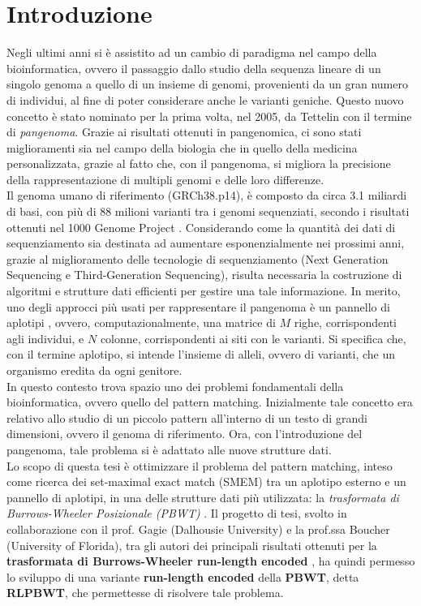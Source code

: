 \documentclass[a4paper,12pt, oneside, draft]{book}
\begin{document}
\chapter{Introduzione}
Negli ultimi anni si è assistito ad un cambio di paradigma nel campo della
bioinformatica, ovvero il passaggio dallo studio della sequenza lineare di un
singolo genoma a quello di un insieme di genomi, provenienti da un gran numero
di individui, al fine di poter considerare anche le varianti
geniche. Questo nuovo concetto è stato nominato per la prima volta, nel 2005,
da Tettelin \cite{tettelin} con il termine di \textit{pangenoma}. Grazie ai
risultati ottenuti in pangenomica, ci sono stati miglioramenti sia nel 
campo della biologia che in quello della medicina personalizzata, grazie al
fatto che, con il pangenoma, si migliora la precisione della rappresentazione di
multipli genomi e delle loro differenze. \\
Il genoma umano di riferimento (GRCh38.p14), è composto da circa
3.1 miliardi di basi, con più di 88 milioni 
varianti tra i genomi sequenziati, secondo i risultati ottenuti nel 1000 Genome
Project \cite{tutorial}. Considerando come la quantità dei dati di
sequenziamento sia destinata 
ad aumentare esponenzialmente nei prossimi anni, grazie al
miglioramento delle tecnologie di sequenziamento (Next Generation Sequencing e
Third-Generation Sequencing), risulta necessaria la costruzione di algoritmi e
strutture dati efficienti per gestire una tale informazione. 
In merito, uno degli approcci più usati per rappresentare il pangenoma è un
pannello di aplotipi \cite{pancon}, ovvero, computazionalmente, una matrice di
$M$ righe, corrispondenti agli individui, e $N$ colonne, corrispondenti ai siti
con le varianti. Si specifica che, con il termine
aplotipo, si intende l'insieme di alleli, ovvero di varianti, che un organismo
eredita da ogni genitore.\\
In questo contesto trova spazio uno dei problemi fondamentali della
bioinformatica, ovvero quello del pattern matching. Inizialmente tale concetto
era relativo allo studio di un piccolo pattern all'interno di un testo di
grandi dimensioni, ovvero il genoma di riferimento. Ora, con l'introduzione 
del pangenoma, tale problema si è adattato alle nuove strutture
dati.\\
Lo scopo di questa tesi è ottimizzare il problema del pattern 
matching, inteso come ricerca dei set-maximal exact match (SMEM) tra un aplotipo
esterno e un pannello di aplotipi, in una delle 
strutture dati più utilizzata: la \textit{trasformata di Burrows-Wheeler
  Posizionale (PBWT)} \cite{pbwt}. Il progetto di tesi, svolto in collaborazione
con il 
prof. Gagie (Dalhousie University) e la prof.ssa Boucher 
(University of Florida), tra gli autori dei principali risultati ottenuti per la
\textbf{trasformata di Burrows-Wheeler run-length encoded} \cite{rlbwt}
\cite{gagie2020} \cite{moni} \cite{phoni}, ha quindi permesso lo sviluppo di una
variante 
\textbf{run-length encoded} della \textbf{PBWT}, detta \textbf{RLPBWT}, che
permettesse di risolvere tale problema.
\end{document}
